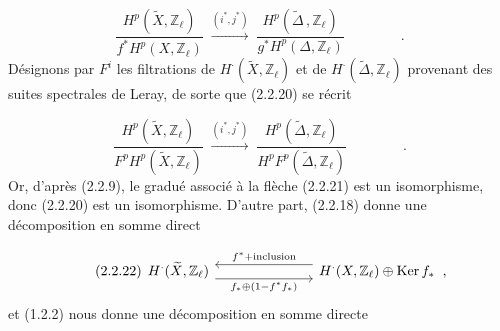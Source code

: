 \begin{equation}\tag{2.2.20}
\frac{H^{p}(\widetilde{X},\mathbb{Z}_{\ell})}{f^{*}H^{p}(X,\mathbb{Z}_{\ell})} \;\stackrel{(i^{*},j^{*})}{\longrightarrow}\; \frac{H^{p}(\widetilde{\Delta}\,,\mathbb{Z}_{\ell})}{g^{*}H^{p}(\Delta,\mathbb{Z}_{\ell})} \qquad\qquad .
\end{equation}
Désignons par $F^{i}$ les filtrations de $H^{\cdot}(\widetilde{X},\mathbb{Z}_{\ell})$ et de $H^{\cdot}(\widetilde{\Delta},\mathbb{Z}_{\ell})$ provenant des suites spectrales de Leray, de sorte que (2.2.20) se récrit 



\begin{equation}\tag{2.2.21}
\frac{H^{p}(\widetilde{X},\mathbb{Z}_{\ell})}{F^{p}H^{p}(\widetilde{X},\mathbb{Z}_{\ell})} \;\stackrel{(i^{*},j^{*})}{\longrightarrow}\; \frac{H^{p}(\widetilde{\Delta},\mathbb{Z}_{\ell})}{H^{p}F^{p}(\widetilde{\Delta},\mathbb{Z}_{\ell})} \qquad\qquad .
\end{equation}
Or, d'après (2.2.9), le gradué associé à la flèche (2.2.21) est un isomorphisme, donc (2.2.20) est un isomorphisme. D'autre part, (2.2.18) donne une décomposition en somme direct

\begin{equation}\tag{2.2.22}
\begin{tikzcd}[column sep=7em]
H^{\cdot}(\widetilde{X},\mathbb{Z}_{\ell}) \arrow[r, shift right=1.2ex, "f_{*}\oplus(1-f^{*}f_{*})"'] & H^{\cdot}(X,\mathbb{Z}_{\ell}) \oplus \mathrm{Ker}\, f_{*} \;\;, \arrow[l, shift right=1.2ex, "f^{*}+\mathrm{inclusion}"']
\end{tikzcd}
\end{equation}
et (1.2.2) nous donne une décomposition en somme directe

